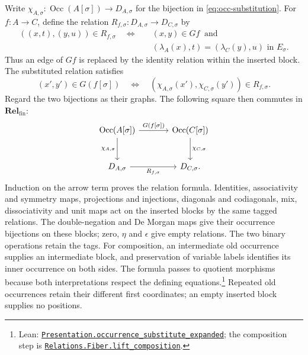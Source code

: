 \documentclass[11pt]{article}
\newcommand{\Occ}{\operatorname{Occ}}
\newcommand{\Rel}{\mathbf{Rel}_{\mathrm{fin}}}
\begin{document}
Write $\chi_{A,\sigma}:\Occ(A[\sigma])\to D_{A,\sigma}$ for
the bijection in \eqref{eq:occ-substitution}. For $f:A\to C$,
define the relation
$R_{f,\sigma}:D_{A,\sigma}\to D_{C,\sigma}$ by
\[
 \begin{aligned}
 ((x,t),(y,u))\in R_{f,\sigma}
 \quad\Longleftrightarrow\quad&
 (x,y)\in Gf\ \text{ and}\\
 &(\lambda_A(x),t)=(\lambda_C(y),u)\text{ in }E_\sigma.
 \end{aligned}
\]
Thus an edge of $Gf$ is replaced by the identity relation within
the inserted block. The substituted relation satisfies
\[
 (x',y')\in G(f[\sigma])
 \quad\Longleftrightarrow\quad
 (\chi_{A,\sigma}(x'),\chi_{C,\sigma}(y'))\in R_{f,\sigma}.
\]
Regard the two bijections as their graphs. The following square
then commutes in $\Rel$:
\[
\begin{tikzcd}[column sep=large,row sep=large]
 \Occ(A[\sigma])\arrow[r,"{G(f[\sigma])}"]
    \arrow[d,"{\chi_{A,\sigma}}"']
   &\Occ(C[\sigma])\arrow[d,"{\chi_{C,\sigma}}"]\\
 D_{A,\sigma}\arrow[r,"{R_{f,\sigma}}"']&D_{C,\sigma}.
\end{tikzcd}
\]
Induction on the arrow term proves the relation formula.
Identities, associativity and symmetry maps, projections and
injections, diagonals and codiagonals, mix, dissociativity and
unit maps act on the inserted blocks by the same tagged relations.
The double-negation and De Morgan maps give their occurrence
bijections on these blocks; zero, $\eta$ and $\epsilon$ give
empty relations. The two binary
operations retain the tags. For composition, an intermediate old
occurrence supplies an intermediate block, and preservation of
variable labels identifies its inner occurrence on both sides.
The formula passes to quotient morphisms because both interpretations
respect the defining equations.\footnote{\raggedright Lean:
\href{https://github.com/flengyel/Dosen-Petric-Maximality/blob/5dbee39bea09539bd130f729e82636419f71f920/DosenPetric/PresentationSubstitutionRelation.lean\#L61}{\texttt{Presentation.\allowbreak{}occurrence\_substitute\_expanded}};
the composition step is
\href{https://github.com/flengyel/Dosen-Petric-Maximality/blob/5dbee39bea09539bd130f729e82636419f71f920/DosenPetric/SubstitutionFiberRelations.lean\#L48}{\texttt{Relations.Fiber.\allowbreak{}lift\_composition}}.}
Repeated old occurrences retain their different first coordinates;
an empty inserted block supplies no positions.
\end{document}
